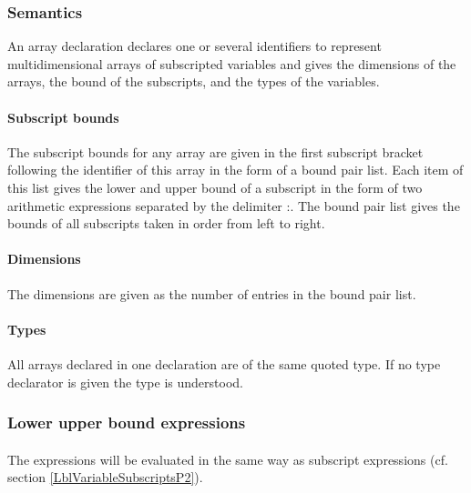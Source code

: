 \documentclass[a4paper,11pt]{article}
\begin{document}
\subsubsection{Semantics}
\label{LblArrayDeclarationsSemantics}

An array declaration declares one or several identifiers to represent
multidimensional arrays of subscripted variables and gives the
dimensions of the arrays, the bound of the subscripts, and the types
of the variables.

\paragraph{Subscript bounds} \label{LblArrayDeclarationsSemanticsP1}
The subscript bounds for any array are given in the first subscript
bracket following the identifier of this array in the form of a bound
pair list.  Each item of this list gives the lower and upper bound of
a subscript in the form of two arithmetic expressions separated by the
delimiter :.  The bound pair list gives the bounds of all subscripts
taken in order from left to right.

\paragraph{Dimensions} \label{LblArrayDeclarationsSemanticsP2}

The dimensions are given as the number of entries in the bound pair
list.

\paragraph{Types} \label{LblArrayDeclarationsSemanticsP3}

All arrays declared in one declaration are of the same quoted type.
If no type declarator is given the type  is understood.


\subsubsection{Lower upper bound expressions}
\label{LblArrayDeclarationsLowerUpperExpressions}

\paragraph{} \label{LblArrayDeclarationsLowerUpperExpressionsP1}
The expressions will be evaluated in the same way as subscript
expressions (cf. section \ref{LblVariableSubscriptsP2}).
\end{document}
